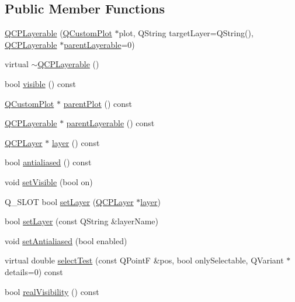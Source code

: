 \subsection*{Public Member Functions}
\begin{DoxyCompactItemize}
\item 
\mbox{\hyperlink{class_q_c_p_layerable_a74c0fa237f29bf0e49565013fc5d1ec0}{Q\+C\+P\+Layerable}} (\mbox{\hyperlink{class_q_custom_plot}{Q\+Custom\+Plot}} $\ast$plot, Q\+String target\+Layer=Q\+String(), \mbox{\hyperlink{class_q_c_p_layerable}{Q\+C\+P\+Layerable}} $\ast$\mbox{\hyperlink{class_q_c_p_layerable_aa78b7e644d2c519e1a9a6f2ac5fcd858}{parent\+Layerable}}=0)
\item 
virtual \mbox{\hyperlink{class_q_c_p_layerable_a4231cf5b3601d6d3a5781283e7a9735b}{$\sim$\+Q\+C\+P\+Layerable}} ()
\item 
bool \mbox{\hyperlink{class_q_c_p_layerable_af0297b944b6192b6d67d00bff41b6b70}{visible}} () const
\item 
\mbox{\hyperlink{class_q_custom_plot}{Q\+Custom\+Plot}} $\ast$ \mbox{\hyperlink{class_q_c_p_layerable_a473edb813a4c1929d6b6a8fe3ff3faf7}{parent\+Plot}} () const
\item 
\mbox{\hyperlink{class_q_c_p_layerable}{Q\+C\+P\+Layerable}} $\ast$ \mbox{\hyperlink{class_q_c_p_layerable_aa78b7e644d2c519e1a9a6f2ac5fcd858}{parent\+Layerable}} () const
\item 
\mbox{\hyperlink{class_q_c_p_layer}{Q\+C\+P\+Layer}} $\ast$ \mbox{\hyperlink{class_q_c_p_layerable_a5ff4862e8c784c9f5986dbc1533ba2a4}{layer}} () const
\item 
bool \mbox{\hyperlink{class_q_c_p_layerable_a71cbd212fde2703cee076e204a475709}{antialiased}} () const
\item 
void \mbox{\hyperlink{class_q_c_p_layerable_a3bed99ddc396b48ce3ebfdc0418744f8}{set\+Visible}} (bool on)
\item 
Q\+\_\+\+S\+L\+OT bool \mbox{\hyperlink{class_q_c_p_layerable_ab0d0da6d2de45a118886d2c8e16d5a54}{set\+Layer}} (\mbox{\hyperlink{class_q_c_p_layer}{Q\+C\+P\+Layer}} $\ast$\mbox{\hyperlink{class_q_c_p_layerable_a5ff4862e8c784c9f5986dbc1533ba2a4}{layer}})
\item 
bool \mbox{\hyperlink{class_q_c_p_layerable_ab25a0e7b897993b44447caee0f142083}{set\+Layer}} (const Q\+String \&layer\+Name)
\item 
void \mbox{\hyperlink{class_q_c_p_layerable_a4fd43e89be4a553ead41652565ff0581}{set\+Antialiased}} (bool enabled)
\item 
virtual double \mbox{\hyperlink{class_q_c_p_layerable_a04db8351fefd44cfdb77958e75c6288e}{select\+Test}} (const Q\+PointF \&pos, bool only\+Selectable, Q\+Variant $\ast$details=0) const
\item 
bool \mbox{\hyperlink{class_q_c_p_layerable_ab054e88f15d485defcb95e7376f119e7}{real\+Visibility}} () const
\end{DoxyCompactItemize}
